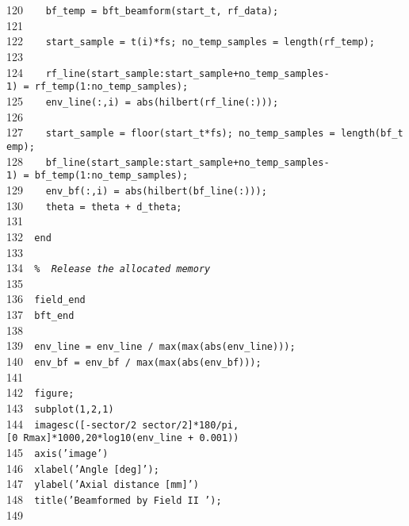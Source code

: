 \documentclass{manual}
\begin{document}
{120{\tt~~}{\tt ~~bf\_temp~=~bft\_beamform(start\_t,~rf\_data);}\\
121{\tt~~}{\tt ~~}\\
122{\tt~~}{\tt ~~start\_sample~=~t(i)*fs;~no\_temp\_samples~=~length(rf\_temp);}\\
123{\tt~~}{\tt ~~}\\
124{\tt~~}{\tt ~~rf\_line(start\_sample:start\_sample+no\_temp\_samples-1)~=~rf\_temp(1:no\_temp\_samples);}\\
125{\tt~~}{\tt ~~env\_line(:,i)~=~abs(hilbert(rf\_line(:)));}\\
126{\tt~~}{\tt }\\
127{\tt~~}{\tt ~~start\_sample~=~floor(start\_t*fs);~no\_temp\_samples~=~length(bf\_temp);}\\
128{\tt~~}{\tt ~~bf\_line(start\_sample:start\_sample+no\_temp\_samples-1)~=~bf\_temp(1:no\_temp\_samples);}\\
129{\tt~~}{\tt ~~env\_bf(:,i)~=~abs(hilbert(bf\_line(:)));}\\
130{\tt~~}{\tt ~~theta~=~theta~+~d\_theta;}\\
131{\tt~~}{\tt }\\
132{\tt~~}{\tt end}\\
133{\tt~~}{\tt }\\
134{\tt~~}{\tt {\sl \%~~Release~the~allocated~memory}}\\
135{\tt~~}{\tt }\\
136{\tt~~}{\tt field\_end}\\
137{\tt~~}{\tt bft\_end}\\
138{\tt~~}{\tt }\\
139{\tt~~}{\tt env\_line~=~env\_line~/~max(max(abs(env\_line)));}\\
140{\tt~~}{\tt env\_bf~=~env\_bf~/~max(max(abs(env\_bf)));}\\
141{\tt~~}{\tt }\\
142{\tt~~}{\tt figure;}\\
143{\tt~~}{\tt subplot(1,2,1)}\\
144{\tt~~}{\tt imagesc([-sector/2~sector/2]*180/pi,[0~Rmax]*1000,20*log10(env\_line~+~0.001))}\\
145{\tt~~}{\tt axis('image')}\\
146{\tt~~}{\tt xlabel('Angle~[deg]');}\\
147{\tt~~}{\tt ylabel('Axial~distance~[mm]')}\\
148{\tt~~}{\tt title('Beamformed~by~Field~II~');}\\
149{\tt~~}{\tt }\\
}
\end{document}
